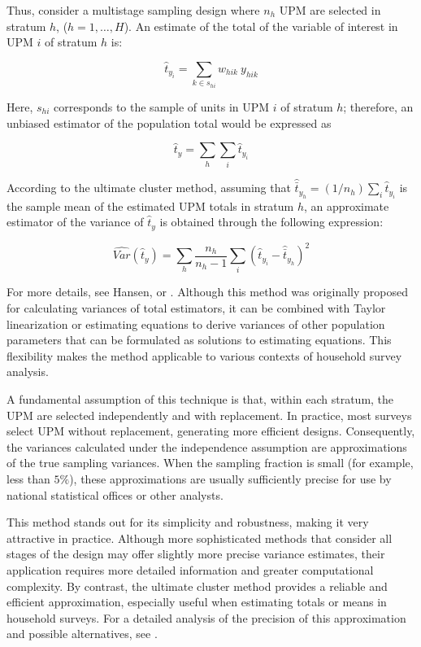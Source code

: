 \documentclass[
  english,
  12pt,
]{book}
\begin{document}
Thus, consider a multistage sampling design where \(n_h\) UPM are selected in stratum \(h\), (\(h=1,\dots,H\)). An estimate of the total of the variable of interest in UPM \(i\) of stratum \(h\) is:

\[
\hat{t}_{y_i} = \sum_{k\in s_{hi}} w_{hik} \ y_{hik}
\]

Here, \(s_{hi}\) corresponds to the sample of units in UPM \(i\) of stratum \(h\); therefore, an unbiased estimator of the population total would be expressed as

\[
\hat{t}_{y}  = \sum_{h}\sum_{i} \hat{t}_{y_i}
\]

According to the ultimate cluster method, assuming that \(\hat{\bar t}_{y_h}=(1/{n_h}) \sum_{i} \hat{t}_{y_i}\) is the sample mean of the estimated UPM totals in stratum \(h\), an approximate estimator of the variance of \(\hat t_y\) is obtained through the following expression:

\[
\widehat{Var}(\hat{t}_y) = \sum_{h} \frac{n_h}{n_h-1} \sum_{i} (\hat{t}_{y_i} - \hat{\bar t}_{y_h})^2
\]

For more details, see Hansen, \citet[p.~258]{hansen1953sample} or \citet{wolter2007}. Although this method was originally proposed for calculating variances of total estimators, it can be combined with Taylor linearization or estimating equations to derive variances of other population parameters that can be formulated as solutions to estimating equations. This flexibility makes the method applicable to various contexts of household survey analysis.

A fundamental assumption of this technique is that, within each stratum, the UPM are selected independently and with replacement. In practice, most surveys select UPM without replacement, generating more efficient designs. Consequently, the variances calculated under the independence assumption are approximations of the true sampling variances. When the sampling fraction is small (for example, less than \(5\%\)), these approximations are usually sufficiently precise for use by national statistical offices or other analysts.

This method stands out for its simplicity and robustness, making it very attractive in practice. Although more sophisticated methods that consider all stages of the design may offer slightly more precise variance estimates, their application requires more detailed information and greater computational complexity. By contrast, the ultimate cluster method provides a reliable and efficient approximation, especially useful when estimating totals or means in household surveys. For a detailed analysis of the precision of this approximation and possible alternatives, see \citet{sarndal2003model}.
\end{document}
